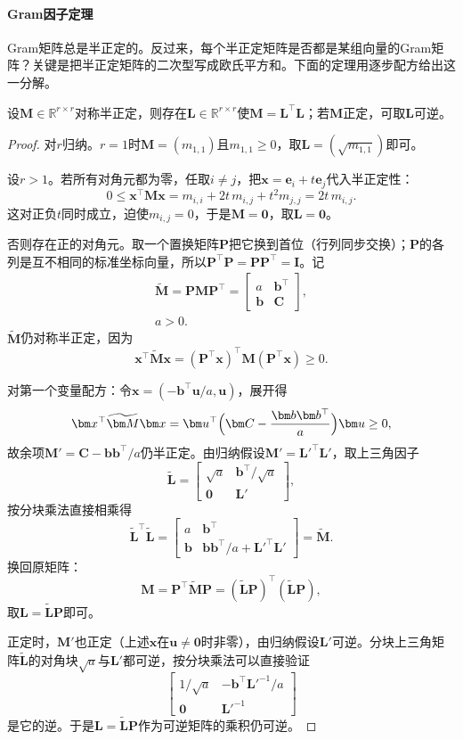 \paragraph{Gram因子定理}
Gram矩阵总是半正定的。反过来，每个半正定矩阵是否都是某组向量的Gram矩阵？关键是把半正定矩阵的二次型写成欧氏平方和。下面的定理用逐步配方给出这一分解。
\begin{theorem}[半正定矩阵的配方因子]
\label{thm:ls-gram-factor}
设$\bm M\in\mathbb R^{r\times r}$对称半正定，则存在$\bm L\in\mathbb R^{r\times r}$使$\bm M=\bm L^\top\bm L$；若$\bm M$正定，可取$\bm L$可逆。
\end{theorem}
\begin{proof}
对$r$归纳。$r=1$时$\bm M=(m_{1,1})$且$m_{1,1}\geq0$，取$\bm L=(\sqrt{m_{1,1}})$即可。

设$r>1$。若所有对角元都为零，任取$i\neq j$，把$\bm x=\bm e_i+t\bm e_j$代入半正定性：
\[
 0\leq\bm x^\top\bm M\bm x=m_{i,i}+2t\,m_{i,j}+t^2m_{j,j}=2t\,m_{i,j}.
\]
这对正负$t$同时成立，迫使$m_{i,j}=0$，于是$\bm M=\bm0$，取$\bm L=\bm0$。

否则存在正的对角元。取一个置换矩阵$\bm P$把它换到首位（行列同步交换）；$\bm P$的各列是互不相同的标准坐标向量，所以$\bm P^\top\bm P=\bm P\bm P^\top=\bm I$。记
\[
\begin{gathered}
\widetilde{\bm M}=\bm P\bm M\bm P^\top
 =\begin{bmatrix}a&\bm b^\top\\ \bm b&\bm C\end{bmatrix},\\
a>0.
\end{gathered}
\]
$\widetilde{\bm M}$仍对称半正定，因为
\[
 \bm x^\top\widetilde{\bm M}\bm x=(\bm P^\top\bm x)^\top\bm M(\bm P^\top\bm x)\geq0 .
\]

对第一个变量配方：令$\bm x=(-\bm b^\top\bm u/a,\bm u)$，展开得
\[
 \bm x^\top\widetilde{\bm M}\bm x=\bm u^\top\Bigl(\bm C-\frac{\bm b\bm b^\top}{a}\Bigr)\bm u\geq0,
\]
故余项$\bm M'=\bm C-\bm b\bm b^\top/a$仍半正定。由归纳假设$\bm M'=\bm L'^\top\bm L'$，取上三角因子
\[
 \widetilde{\bm L}=\begin{bmatrix}\sqrt a&\bm b^\top/\sqrt a\\ \bm0&\bm L'\end{bmatrix},
\]
按分块乘法直接相乘得
\[
 \widetilde{\bm L}^\top\widetilde{\bm L}
 =\begin{bmatrix}a&\bm b^\top\\ \bm b&\bm b\bm b^\top/a+\bm L'^\top\bm L'\end{bmatrix}
 =\widetilde{\bm M}.
\]
换回原矩阵：
\[
 \bm M=\bm P^\top\widetilde{\bm M}\bm P=(\widetilde{\bm L}\bm P)^\top(\widetilde{\bm L}\bm P),
\]
取$\bm L=\widetilde{\bm L}\bm P$即可。

正定时，$\bm M'$也正定（上述$\bm x$在$\bm u\neq\bm0$时非零），由归纳假设$\bm L'$可逆。分块上三角矩阵$\widetilde{\bm L}$的对角块$\sqrt a$与$\bm L'$都可逆，按分块乘法可以直接验证
\[
 \begin{bmatrix}1/\sqrt a&-\bm b^\top\bm L'^{-1}/a\\ \bm0&\bm L'^{-1}\end{bmatrix}
\]
是它的逆。于是$\bm L=\widetilde{\bm L}\bm P$作为可逆矩阵的乘积仍可逆。
\end{proof}
